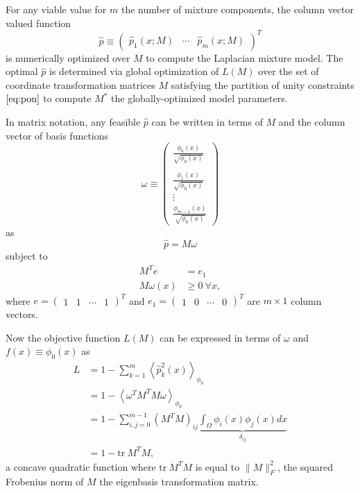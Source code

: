 \documentclass[10pt,letterpaper]{article}
\begin{document}
For any viable value for $m$ the number of mixture components, the column vector valued function
\begin{equation*}
\hat p \equiv \left(\begin{array}{ccc}\hat p_1(x; M) & \cdots & \hat p_m(x; M) \end{array}\right)^T
\end{equation*}
is numerically optimized over $M$ to compute the Laplacian mixture model.
The optimal $\hat p$ is determined via global optimization of $L(M)$ over the set of coordinate transformation matrices $M$ satisfying the partition of unity constraints $\eqref{eq:pou}$ to compute $M^*$ the globally-optimized model parameters.

In matrix notation, any feasible $\hat p$ can be written in terms of $M$ and the column vector of basis functions
\begin{equation}
\omega \equiv \left(
  \begin{array}{c}
    \frac{\phi_0(x)}{\sqrt{\phi_0(x)}}\\ \\
    \frac{\phi_1(x)}{\sqrt{\phi_0(x)}}\\
    \vdots\\
    \frac{\phi_{m - 1}(x)}{\sqrt{\phi_0(x)}}
  \end{array}
\right)\label{eq:omega}
\end{equation}
as
\begin{equation*}
\hat p = M \omega
\end{equation*}
subject to
\begin{align*}
M^T e &= e_1\\
M \omega (x) &\geqslant 0\ \forall x,
\end{align*}
where $e = \left( \begin{array}{cccc} 1 & 1 & \cdots & 1\end{array}\right)^T$ and $e_1 = \left( \begin{array}{cccc}1 & 0 & \cdots & 0\end{array}\right)^T$ are $m \times 1$ column vectors.

Now the objective function $L(M)$ can be expressed in terms of $\omega$ and $f(x) \equiv \phi_0(x)$ as
\begin{align*}
L &= 1 - \sum_{k = 1}^m \left\langle \hat p_k^2(x) \right\rangle_{\phi_0}\\
&= 1 - \left\langle \omega^T M^T M \omega \right\rangle_{\phi_0}\\
&= 1 - \sum_{i, j = 0}^{m - 1} \left(M^T M\right)_{ij} \underbrace{\int_\Omega \phi_i(x) \phi_j(x) dx}_{\delta_{ij}} \\
&= 1 - \mathrm{tr}\ M^T M,
\end{align*}
a concave quadratic function where $\mathrm{tr}\ M^T M$  is equal to $\| M \|_F^2$, the squared Frobenius norm of $M$ the eigenbasis transformation matrix.
\end{document}

